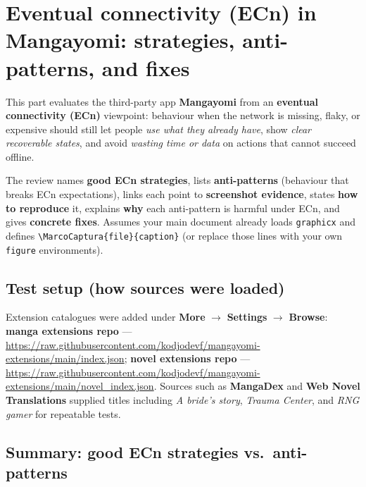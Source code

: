 \section{Eventual connectivity (ECn) in Mangayomi: strategies, anti-patterns, and fixes}

This part evaluates the third-party app \textbf{Mangayomi} from an \textbf{eventual connectivity (ECn)} viewpoint: behaviour when the network is missing, flaky, or expensive should still let people \emph{use what they already have}, show \emph{clear recoverable states}, and avoid \emph{wasting time or data} on actions that cannot succeed offline.

The review names \textbf{good ECn strategies}, lists \textbf{anti-patterns} (behaviour that breaks ECn expectations), links each point to \textbf{screenshot evidence}, states \textbf{how to reproduce} it, explains \textbf{why} each anti-pattern is harmful under ECn, and gives \textbf{concrete fixes}. Assumes your main document already loads \texttt{graphicx} and defines \texttt{\textbackslash MarcoCaptura\{file\}\{caption\}} (or replace those lines with your own \texttt{figure} environments).

\subsection{Test setup (how sources were loaded)}
\label{sec:ecn-setup}

Extension catalogues were added under \textbf{More} $\rightarrow$ \textbf{Settings} $\rightarrow$ \textbf{Browse}: \textbf{manga extensions repo} --- \url{https://raw.githubusercontent.com/kodjodevf/mangayomi-extensions/main/index.json}; \textbf{novel extensions repo} --- \url{https://raw.githubusercontent.com/kodjodevf/mangayomi-extensions/main/novel_index.json}. Sources such as \textbf{MangaDex} and \textbf{Web Novel Translations} supplied titles including \emph{A bride's story}, \emph{Trauma Center}, and \emph{RNG gamer} for repeatable tests.

\subsection{Summary: good ECn strategies vs.\ anti-patterns}

